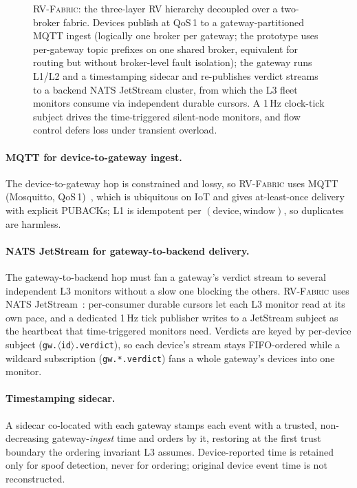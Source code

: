 \documentclass[runningheads]{llncs}
\newcommand{\sys}{\textsc{RV-Fabric}\xspace}
\begin{document}
\begin{figure}[t]
{}
\caption{\sys: the three-layer RV hierarchy decoupled over a two-broker fabric.
Devices publish at QoS\,1 to a gateway-partitioned MQTT ingest (logically one broker per
gateway; the prototype uses per-gateway topic prefixes on one shared broker, equivalent
for routing but without broker-level fault isolation); the gateway runs L1/L2 and a
timestamping sidecar and re-publishes verdict streams to a backend NATS JetStream cluster,
from which the L3 fleet monitors consume via independent durable cursors. A 1\,Hz clock-tick subject drives the time-triggered silent-node
monitors, and flow control defers loss under transient overload.}
\label{fig:arch}
\end{figure}

\paragraph{MQTT for device-to-gateway ingest.}
The device-to-gateway hop is constrained and lossy, so \sys uses MQTT (Mosquitto,
QoS\,1)~\cite{mqtt,mosquitto}, which is ubiquitous on IoT and gives at-least-once delivery
with explicit PUBACKs; L1 is idempotent per $(\text{device},\text{window})$, so duplicates
are harmless.

\paragraph{NATS JetStream for gateway-to-backend delivery.}
The gateway-to-backend hop must fan a gateway's verdict stream to several
independent L3 monitors without a slow one blocking the others. \sys uses NATS
JetStream~\cite{nats}: per-consumer durable cursors let each L3 monitor read at
its own pace, and a dedicated 1\,Hz tick publisher writes to a JetStream subject
as the heartbeat that time-triggered monitors need. Verdicts are keyed by
per-device subject (\texttt{gw.$\langle$id$\rangle$.verdict}), so each device's stream
stays FIFO-ordered while a wildcard subscription (\texttt{gw.*.verdict}) fans a whole
gateway's devices into one monitor.

\paragraph{Timestamping sidecar.}
A sidecar co-located with each gateway stamps each event with a trusted, non-decreasing
gateway-\emph{ingest} time and orders by it, restoring at the first trust boundary the
ordering invariant L3 assumes. Device-reported time is retained only for
spoof detection, never for ordering; original device event time is not reconstructed.
\end{document}
